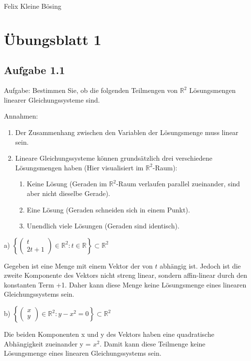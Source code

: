 \documentclass[11pt]{article}
\begin{document}
    Felix Kleine Bösing
    \section{Übungsblatt 1}

    \subsection{Aufgabe 1.1}
    Aufgabe: Bestimmen Sie, ob die folgenden Teilmengen von $\mathbb{R}^2$ Lösungsmengen linearer Gleichungssysteme sind.

    \bigskip
    Annahmen:
    \begin{enumerate}
        \item Der Zusammenhang zwischen den Variablen der Lösungsmenge muss linear sein.
        \item Lineare Gleichungssysteme können grundsätzlich drei verschiedene Lösungsmengen haben (Hier visualisiert im $\mathbb{R}^2$-Raum):
        \begin{enumerate}
            \item Keine Lösung (Geraden im $\mathbb{R}^2$-Raum verlaufen parallel zueinander, sind aber nicht dieselbe Gerade).
            \item Eine Lösung (Geraden schneiden sich in einem Punkt).
            \item Unendlich viele Lösungen (Geraden sind identisch).
        \end{enumerate}
    \end{enumerate}
    \bigskip

    a)    $\left\{ \begin{pmatrix} t \\ 2t+1 \end{pmatrix} \in \mathbb{R}^2 : t \in \mathbb{R} \right\} \subset \mathbb{R}^2$
    \bigskip

    Gegeben ist eine Menge mit einem Vektor der von $t$ abhängig ist. Jedoch ist die zweite Komponente des Vektors nicht streng linear, sondern affin-linear durch den konstanten Term +1.
    Daher kann diese Menge keine Lösungsmenge eines linearen Gleichungssystems sein.

    \bigskip
    b)    $\left\{ \begin{pmatrix} x \\ y \end{pmatrix} \in \mathbb{R}^2 : y - x^2 = 0 \right\} \subset \mathbb{R}^2$
    \bigskip

    Die beiden Komponenten x und y des Vektors haben eine quadratische Abhängigkeit zueinander y = $x^2$.
    Damit kann diese Teilmenge keine Lösungsmenge eines linearen Gleichungssystems sein.
\end{document}
